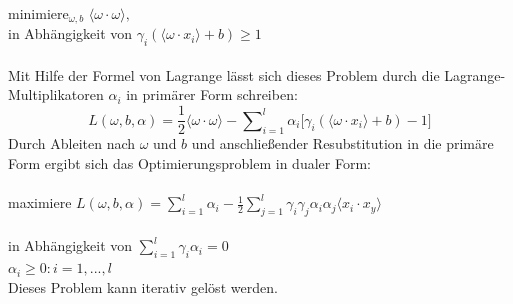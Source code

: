\qquad minimiere$_{\omega,b}$ \hfill $\langle \omega \cdot \omega \rangle,$ \\

\qquad in Abhängigkeit von \hfill $\gamma_{i}(\langle \omega \cdot x_{i} \rangle + b) \geq 1 $ \\\\
Mit Hilfe der Formel von Lagrange lässt sich dieses Problem durch die Lagrange-Multiplikatoren $\alpha_{i}$ in primärer Form schreiben:
\[ L(\omega,b,\alpha) = \frac{1}{2} \langle \omega \cdot \omega \rangle -  \sum\nolimits_{i=1}^l \alpha_{i} \lbrack \gamma_{i} (\langle \omega \cdot x_{i} \rangle + b) -1 \rbrack\]
Durch Ableiten nach $\omega$ und $b$ und anschließender Resubstitution in die primäre Form ergibt sich das Optimierungsproblem in dualer Form: \\\\

\qquad maximiere \hfill $L(\omega,b,\alpha) = \sum\nolimits_{i=1}^l \alpha_{i} - \frac{1}{2} \sum\nolimits_{j=1}^l \gamma_{i} \gamma_{j} \alpha_{i} \alpha_{j} \langle x_{i} \cdot x_{y} \rangle$ \\\\

\qquad in Abhängigkeit von \hfill $\sum\nolimits_{i=1}^l \gamma_{i} \alpha_{i} = 0$\\

\hfill $ \alpha_{i} \geq 0: i = 1,...,l$\\
Dieses Problem kann iterativ gelöst werden.\cite{laechele-svm}

